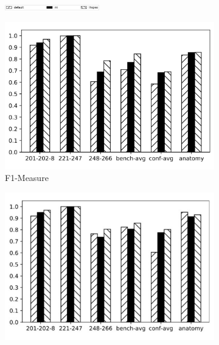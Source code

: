\documentclass[twoside]{article}
\begin{document}
\begin{figure}[htb!]\centering
\begin{subfigure}{\textwidth}
	\centering
\includegraphics[width=0.45\textwidth]{figures/t_legend.jpg}
\end{subfigure}
\begin{subfigure}{0.3\textwidth}
	\centering
\includegraphics[width=\textwidth]{data_figs/MulRegress_Falcon_AO_F1.pdf}
\caption{F1-Measure}
\label{fig:MultiRegress_Falcon_AO_F1-Measure}
\end{subfigure}
\begin{subfigure}{0.3\textwidth}
	\centering
\includegraphics[width=\textwidth]{data_figs/MulRegress_Falcon_AO_P.pdf}

\end{subfigure}
\end{figure}
\end{document}

